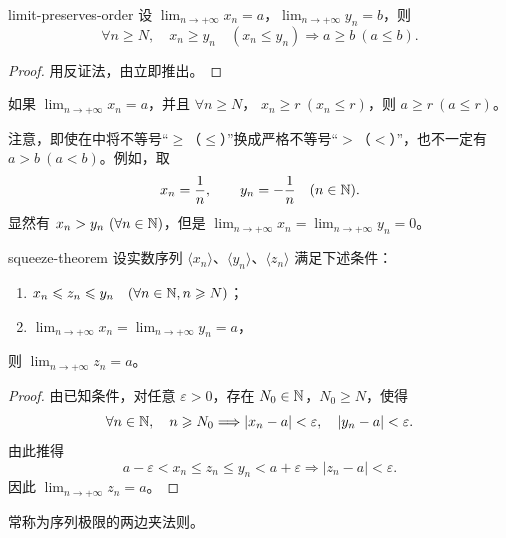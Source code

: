 \begin{myproperty}{}{limit-preserves-order}
设 \(\lim_{n\to+\infty}x_n=a\)，\(\lim_{n\to+\infty}y_n=b\)，则
\[
\forall n\geqslant N,\quad x_n\geqslant y_n\quad(x_n\leqslant y_n)
\Longrightarrow a\geqslant b\ (a\leqslant b).
\]
\end{myproperty}

\begin{proof}
用反证法，由立即推出。
\end{proof}

\begin{mycor*}{}
如果 \(\lim_{n\to+\infty}x_n=a\)，并且 \(\forall n\geqslant N\)，
\(x_n\geqslant r\ (x_n\leqslant r)\)，则 \(a\geqslant r\ (a\leqslant r)\)。
\end{mycor*}

注意，即使在中将不等号“\(\geqslant\)（\(\leqslant\)）”换成严格不等号“\(>\)（\(<\)）”，也不一定有 \(a>b\ (a<b)\)。例如，取
\[
x_n=\frac1n,\qquad y_n=-\frac1n\quad(n\in\mathbb{N}).
\]
显然有 \(x_n>y_n\ (\forall n\in\mathbb{N})\)，但是
\(\lim_{n\to+\infty}x_n=\lim_{n\to+\infty}y_n=0\)。

\begin{myproperty}{}{squeeze-theorem}
设实数序列 \(\langle x_n\rangle\)、\(\langle y_n\rangle\)、\(\langle z_n\rangle\) 满足下述条件：
\begin{enumerate}[label=\arabic*)]
  \item \(x_n\leqslant z_n\leqslant y_n\quad(\forall n\in\mathbb{N}, n\geqslant N)\)；
  \item \(\displaystyle\lim_{n\to+\infty}x_n=\lim_{n\to+\infty}y_n=a\)，
\end{enumerate}
则 \(\lim_{n\to+\infty}z_n=a\)。
\end{myproperty}

\begin{proof}
由已知条件，对任意 \(\varepsilon>0\)，存在 \(N_0\in\mathbb{N}\)，\(N_0\geqslant N\)，使得
\[
\forall n\in\mathbb{N},\quad n\geqslant N_0
\Longrightarrow |x_n-a|<\varepsilon,\quad |y_n-a|<\varepsilon.
\]
由此推得
\[
a-\varepsilon<x_n\leqslant z_n\leqslant y_n<a+\varepsilon
\Longrightarrow |z_n-a|<\varepsilon.
\]
因此 \(\lim_{n\to+\infty}z_n=a\)。
\end{proof}

常称为序列极限的两边夹法则。

